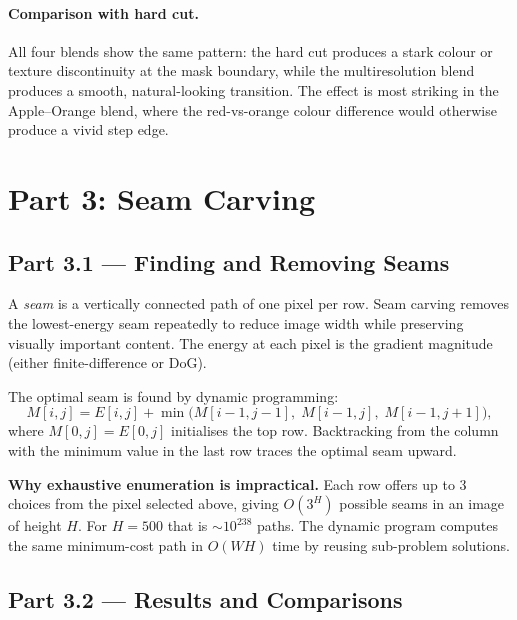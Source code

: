 \documentclass[12pt,a4paper]{article}
\begin{document}
\paragraph{Comparison with hard cut.}
All four blends show the same pattern: the hard cut produces a stark colour or
texture discontinuity at the mask boundary, while the multiresolution blend
produces a smooth, natural-looking transition.  The effect is most striking in
the Apple--Orange blend, where the red-vs-orange colour difference would
otherwise produce a vivid step edge.

\section{Part 3: Seam Carving}

\subsection{Part 3.1 \texorpdfstring{---}{-} Finding and Removing Seams}

A \emph{seam} is a vertically connected path of one pixel per row.  Seam
carving removes the lowest-energy seam repeatedly to reduce image width while
preserving visually important content.  The energy at each pixel is the
gradient magnitude (either finite-difference or DoG).

The optimal seam is found by dynamic programming:
\begin{equation}
  M[i,j] = E[i,j] + \min\bigl(M[i-1,j-1],\; M[i-1,j],\; M[i-1,j+1]\bigr),
  \label{eq:dp}
\end{equation}
where $M[0,j]=E[0,j]$ initialises the top row.  Backtracking from the column
with the minimum value in the last row traces the optimal seam upward.

\textbf{Why exhaustive enumeration is impractical.}
Each row offers up to 3 choices from the pixel selected above, giving
$O(3^H)$ possible seams in an image of height $H$.  For $H=500$ that is
$\sim10^{238}$ paths.  The dynamic program computes the same minimum-cost
path in $O(WH)$ time by reusing sub-problem solutions.

\subsection{Part 3.2 \texorpdfstring{---}{-} Results and Comparisons}
\end{document}
